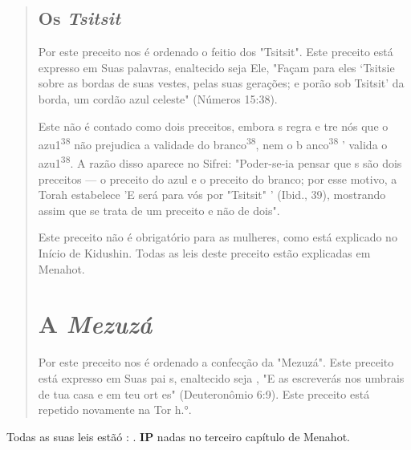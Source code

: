 \begin{quote}
\section{Os \emph{Tsitsit}}

Por este preceito nos é ordenado o feitio dos "Tsitsit". Este precei­to
está expresso em Suas palavras, enaltecido seja Ele, "Façam para eles
`Tsitsie sobre as bordas de suas vestes, pelas suas gerações; e porão
sob Tsitsit' da borda, um cordão azul celeste" (Números 15:38).

Este não é contado como dois preceitos, embora s regra e tre nós que o
azu1\textsuperscript{38} não prejudica a validade do
branco\textsuperscript{38}, nem o b anco\textsuperscript{38} ' valida o
azu1\textsuperscript{38}. A razão disso aparece no Sifrei: "Poder-se-ia
pensar que s são dois preceitos --- o preceito do azul e o preceito do
branco; por esse motivo, a To­rah estabelece 'E será para vós por
"Tsitsit" ' (Ibid., 39), mostrando assim que se trata de um preceito e
não de dois".

Este preceito não é obrigatório para as mulheres, como está explicado no
Início de Kidushin. Todas as leis deste preceito estão explicadas em
Menahot.

\chapter{A \emph{Mezuzá}}

Por este preceito nos é ordenado a confecção da "Mezuzá". Este
preceito está expresso em Suas pai s, enaltecido seja , "E as escreverás
nos umbrais de tua casa e em teu ort es" (Deuteronômio 6:9). Este
preceito está repetido novamente na Tor h.°.
\end{quote}

Todas as suas leis estãó : . \textbf{IP} nadas no terceiro capítulo de
Menahot.

